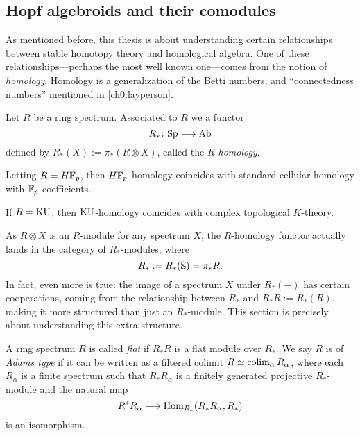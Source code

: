 

\subsection{Hopf algebroids and their comodules}
\label{ch0:ssec:hopf-algebroids-and-their-comodules}

As mentioned before, this thesis is about understanding certain relationships between stable homotopy theory and homological algebra. One of these relationships---perhaps the most well known one---comes from the notion of \emph{homology}. Homology is a generalization of the Betti numbers, and ``connectedness numbers'' mentioned in \cref{ch0:layperson}. 

\begin{definition}
    Let $R$ be a ring spectrum. Associated to $R$ we a functor
    \[R_* \: \Sp \to \Ab\]
    defined by $R_*(X):= \pi_*(R\otimes X)$, called the \emph{$R$-homology}. 
\end{definition}

\begin{example}
    Letting $R = H\F_p$, then $H\F_p$-homology coincides with standard cellular homology with $\F_p$-coefficients. 
\end{example}

\begin{example}
    If $R=\KU$, then $\KU$-homology coincides with complex topological $K$-theory. 
\end{example}

As $R\otimes X$ is an $R$-module for any spectrum $X$, the $R$-homology functor actually lands in the category of $R_*$-modules, where 
\[R_*:= R_*(\S) = \pi_* R.\] 
In fact, even more is true: the image of a spectrum $X$ under $R_*(-)$ has certain cooperations, coming from the relationship between $R_*$ and $R_*R:= R_*(R)$, making it more structured than just an $R_*$-module. This section is precisely about understanding this extra structure. 

\begin{definition}
    \label{ch0:def:flat-and-adams-type-ring}
    A ring spectrum $R$ is called \emph{flat} if $R_*R$ is a flat module over $R_*$. We say $R$ is of \emph{Adams type} if it can be written as a filtered colimit $R\simeq \colim_\alpha R_\alpha$, where each $R_\alpha$ is a finite spectrum such that $R_*R_\alpha$ is a finitely generated projective $R_*$-module and the natural map 
    \[R^*R_\alpha \longrightarrow \Hom_{R_*}(R_*R_\alpha, R_*)\] 
    is an isomorphism.
\end{definition}

